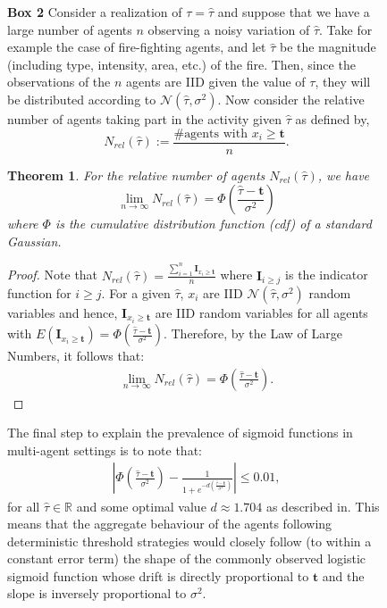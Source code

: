 \documentclass{nature}
\newtheorem{theorem}{Theorem}
\def\R{\mathbb{R}}    %
\def\td{\mathbf{t}}   %
\begin{document}
\nolinenumbers
\begin{figure}
\begin{framed}
\textbf{Box 2} 
Consider a realization of $\tau=\hat{\tau}$ and suppose that we have a large number of agents $n$ observing a noisy variation of $\hat{\tau}$. Take for example the case of fire-fighting agents, and let $\hat{\tau}$ be the magnitude (including type, intensity, area, etc.) of the fire. Then, since the observations of the $n$ agents are IID given the value of $\tau$, they will be distributed according to $\mathcal{N}(\hat{\tau},\sigma^2)$. Now consider the relative number of agents taking part in the activity given $\hat{\tau}$ as defined by, 
\begin{equation*}
	N_{rel}(\hat{\tau}):=\frac{\#\text{agents with }x_i\geq \td}{n}.
\end{equation*}

\begin{theorem}\label{thrm:relativefrequency}
For the relative number of agents $N_{rel}(\hat{\tau})$, we have
\begin{equation}
\lim_{n\to\infty}N_{rel}(\hat{\tau})=\Phi(\frac{\hat{\tau}-\td}{\sigma^2})
\end{equation}
where $\Phi$ is the cumulative distribution function (cdf) of a standard Gaussian. 
\end{theorem}
\begin{proof}
Note that $N_{rel}(\hat{\tau})=\frac{\sum_{i=1}^n\mathbf{I}_{x_i\geq \td}}{n}$ where $\mathbf{I}_{i\geq j}$ is the indicator function for $i\geq j$. For a given $\hat{\tau}$, $x_i$ are IID $\mathcal{N}(\hat{\tau},\sigma^2)$ random variables and hence, $\mathbf{I}_{x_i\geq \td}$ are IID random variables for all agents with $E(\mathbf{I}_{x_i\geq \td})=\Phi(\frac{\hat{\tau}-\td}{\sigma^2})$. Therefore, by the Law of Large Numbers, it follows that:
\vspace{-5px}
\begin{align*}
\lim_{n\to\infty}N_{rel}(\hat{\tau})=\Phi(\frac{\hat{\tau}-\td}{\sigma^2}).
\end{align*}
\vspace{-35px}
\end{proof}

The final step to explain the prevalence of sigmoid functions in multi-agent settings is to note that:
\begin{align*}
|\Phi(\frac{\hat{\tau}-\td}{\sigma^2})-\frac{1}{1+e^{-d(\frac{\hat{\tau}-\td}{\sigma^2})}}|\leq 0.01,
\end{align*}
for all $\hat{\tau}\in\R$ and some optimal value $d\approx 1.704$ as described in\cite{Camilli1994}. This means that the aggregate behaviour of the agents following deterministic threshold strategies would closely follow (to within a constant error term) the shape of the commonly observed logistic sigmoid function whose drift is directly proportional to $\td$ and the slope is inversely proportional to $\sigma^2$. 
\end{framed}
\end{figure}
\end{document}

